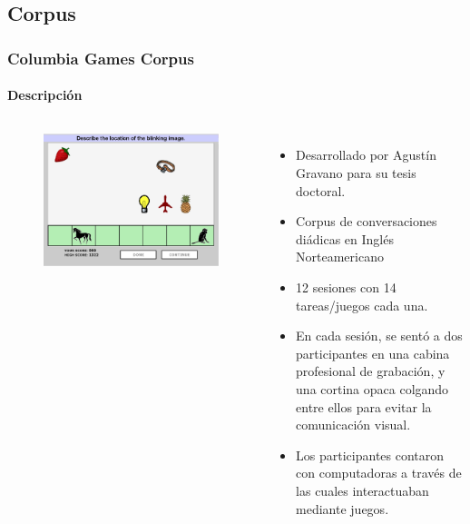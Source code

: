 \subsection{Corpus}
\begin{frame}
  \frametitle{Columbia Games Corpus}
  \framesubtitle{Descripción}
  \begin{columns}
      \begin{figure}
        \includegraphics[width=\textwidth]{images/columbia_games_color.jpg}
      \end{figure}


    \begin{itemize}
      \item Desarrollado por Agustín Gravano para su tesis doctoral.
      \item Corpus de conversaciones diádicas en Inglés Norteamericano
      \item 12 sesiones con 14 tareas/juegos cada una.
      \item En cada sesión, se sentó a dos participantes en una cabina profesional de grabación, y una cortina opaca colgando entre ellos para evitar la comunicación visual.
      \item Los participantes contaron con computadoras a través de las cuales interactuaban mediante juegos.
    \end{itemize}
  \end{columns}
\end{frame}



